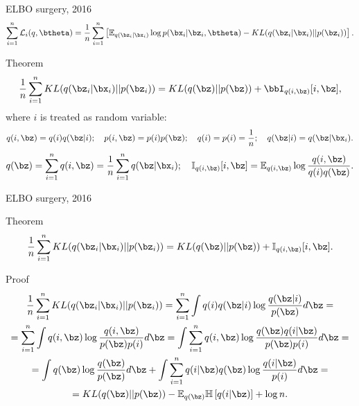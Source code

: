 \begin{frame}{ELBO surgery, 2016}
	\vspace{-0.3cm}
	\[
	    \sum_{i=1}^n \mathcal{L}_i(q, \btheta) = \frac{1}{n} \sum_{i=1}^n \left[ \mathbb{E}_{q(\bz_i | \bx_i)} \log p(\bx_i | \bz_i, \btheta) - KL(q(\bz_i | \bx_i) || p(\bz_i)) \right].
	\]
	\vspace{-0.3cm}
	\begin{block}{Theorem}
	\[
	    \frac{1}{n} \sum_{i=1}^n KL(q(\bz_i | \bx_i) || p(\bz_i)) = KL(q(\bz) || p(\bz)) + \bbI_{q(i, \bz)} [i, \bz],
	\]
	where $i$ is treated as random variable:
	\footnotesize{
	\[
	    q(i, \bz) = q(i) q(\bz | i); \quad p(i, \bz) = p(i) p(\bz); \quad 
	    q(i) = p(i) = \frac{1}{n}; \quad q(\bz | i) = q(\bz | \bx_i).
	\]
	\[
	    q(\bz) = \sum_{i=1}^n q(i, \bz) = \frac{1}{n} \sum_{i=1}^n q(\bz | \bx_i); \quad  \mathbb{I}_{q(i, \bz)} [i, \bz] = \mathbb{E}_{q(i, \bz)} \log \frac{q(i, \bz)}{q(i)q(\bz)}.
	\]
	}
	\end{block}
\end{frame}
\begin{frame}{ELBO surgery, 2016}
	\begin{block}{Theorem}
	\[
	    \frac{1}{n} \sum_{i=1}^n KL(q(\bz_i | \bx_i) || p(\bz_i)) = KL(q(\bz) || p(\bz)) + \mathbb{I}_{q(i, \bz)} [i, \bz].
	\]
	\end{block}
	\begin{block}{Proof}
	\vspace{-0.3cm}
	{\footnotesize
	\begin{multline*}
	    \frac{1}{n} \sum_{i=1}^n KL(q(\bz_i | \bx_i) || p(\bz_i)) = \sum_{i=1}^n \int q(i) q(\bz | i) \log \frac{q(\bz | i)}{p(\bz)} d \bz = \\
	    = \sum_{i=1}^n \int q(i, \bz) \log \frac{q(i, \bz)}{p(\bz)p(i)} d \bz =
	    \int \sum_{i=1}^n q(i, \bz) \log \frac{ q (\bz) q(i | \bz) }{p(\bz) p(i) } d \bz = \\
	    = \int q(\bz) \log \frac{q(\bz)}{p(\bz)} d\bz + \int \sum_{i=1}^n q(i | \bz) q(\bz) \log \frac{q(i | \bz)}{p(i)} d \bz = \\
	    = KL (q(\bz) || p(\bz)) - \mathbb{E}_{q(\bz)} \mathbb{H} \left[q(i | \bz)  \right] + \log n.
	\end{multline*}
	}
	\end{block}

\end{frame}
